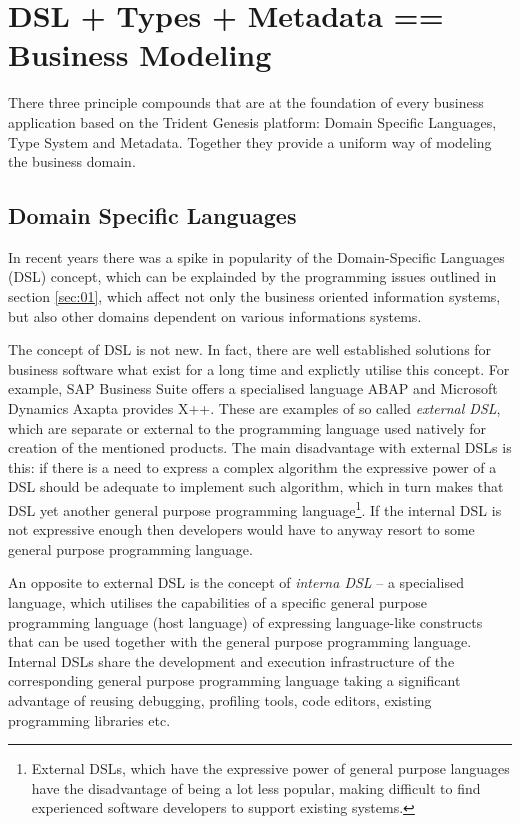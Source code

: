 \section{DSL + Types + Metadata == Business Modeling}\label{sec:03}

  There three principle compounds that are at the foundation of every business application based on the Trident Genesis platform: Domain Specific Languages, Type System and Metadata.
  Together they provide a uniform way of modeling the business domain.

\subsection{Domain Specific Languages}

  In recent years there was a spike in popularity of the Domain-Specific Languages (DSL) concept, which can be explainded by the programming issues outlined in section \ref{sec:01}, which affect not only the business oriented information systems, but also other domains dependent on various informations systems.

  The concept of DSL is not new.
  In fact, there are well established solutions for business software what exist for a long time and explictly utilise this concept.
  For example, SAP Business Suite offers a specialised language ABAP and Microsoft Dynamics Axapta provides X++.
  These are examples of so called \emph{external DSL}, which are separate or external to the programming language used natively for creation of the mentioned products.
  The main disadvantage with external DSLs is this: if there is a need to express a complex algorithm the expressive power of a DSL should be adequate to implement such algorithm, which in turn makes that DSL yet another general purpose programming language\footnote{External DSLs, which have the expressive power of general purpose languages have the disadvantage of being a lot less popular, making difficult to find experienced software developers to support existing systems.}.
  If the internal DSL is not expressive enough then developers would have to anyway resort to some general purpose programming language.

  An opposite to external DSL is the concept of \emph{interna DSL} -- a specialised language, which utilises the capabilities of a specific general purpose programming language (host language) of expressing language-like constructs that can be used together with the general purpose programming language.
  Internal DSLs share the development and execution infrastructure of the corresponding general purpose programming language taking a significant advantage of reusing debugging, profiling tools, code editors, existing programming libraries etc.

